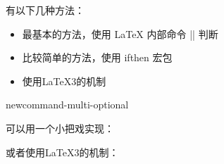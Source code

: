 
有以下几种方法：
\begin{itemize}
\item 最基本的方法，使用 \LaTeX{} 内部命令 |\@ifstar| 判断
\begin{texlist}
    \makeatletter
    \newcommand{\mycommand}{%
      \@ifstar
        \mycommandStar%
        \mycommandNoStar%
    }
    \makeatother
    \newcommand{\mycommandStar}{starred version}
    \newcommand{\mycommandNoStar}{normal version}
\end{texlist}
\item 比较简单的方法，使用 ifthen 宏包
\begin{texlist}
    \usepackage{ifthen}
    \newcommand{\mycommand}[1]{\ifthenelse{\equal{#1}{*}}%
      {\mycommandStar}%
      {\mycommandNoStar{#1}}%
    }
    \newcommand{\mycommandStar}{starred version}
    \newcommand{\mycommandNoStar}[1]{normal version}  
\end{texlist}
\item 使用\LaTeX{3}的机制
\begin{texlist}
    \usepackage{xparse}
    \NewDocumentCommand{}
\end{texlist}
\end{itemize}




{newcommand-multi-optional}

可以用一个小把戏实现：
\begin{texlist}
  \newcommand{\mycmd}[1][option1]{%
    \def\ArgI{{#1}}%
    \mycmdoptii
  }
  \newcommand\mycmdoptii[1][option2]{%
    ...
  }
\end{texlist}

或者使用\LaTeX{3}的机制：
\begin{texlist}
  \usepackage{xparse}
  \NewDocumentCommand{}
\end{texlist}





